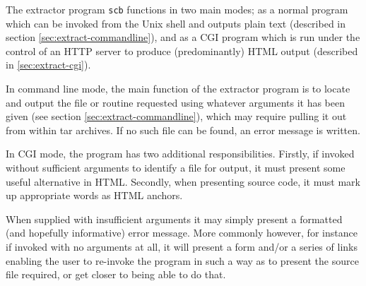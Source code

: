 \documentclass[twoside,11pt]{article}
\renewcommand{\_}{\texttt{\symbol{95}}}
\begin{document}
The extractor program {\tt scb} functions in two main modes;
as a normal program which can be invoked from the Unix shell and
outputs plain text (described in section \ref{sec:extract-commandline}),
and as a CGI program which is run under the control of an HTTP server
to produce (predominantly) HTML output (described in \ref{sec:extract-cgi}).

In command line mode, the main function of the extractor
program is to locate and output
the file or routine requested using whatever arguments it
has been given (see section \ref{sec:extract-commandline}),
which may require pulling it out from within tar archives.
If no such file can be found, an error message is written.

In CGI mode, the program has two additional responsibilities.
Firstly, if invoked without sufficient arguments to identify
a file for output, it must present some useful alternative in HTML.
Secondly, when presenting source code, it must mark up
appropriate words as HTML anchors.

When supplied with insufficient arguments it may simply present
a formatted (and hopefully informative) error message.
More commonly however, for instance if invoked with no arguments
at all, it will present a form and/or a series of links
enabling the user to re-invoke the program
in such a way as to present the source file required,
or get closer to being able to do that.
\end{document}
